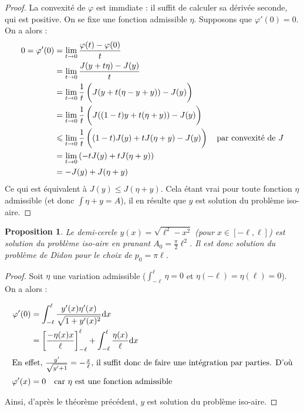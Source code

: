 \documentclass[10pt,a4paper]{article}
\renewcommand{\d}{\mathrm{d}}
\renewcommand{\phi}{\varphi}
\theoremstyle{plain}
\newtheorem{prop}[thm]{Proposition}
\theoremstyle{definition}
\begin{document}
\begin{proof}
La convexité de $\phi$ est immdiate : il suffit de calculer sa dérivée seconde, qui est positive.
On se fixe une fonction admissible $\eta$. Supposons que $\phi'(0)=0$. On a alors :
\begin{align*}
0=\phi'(0)&=\lim_{t\to 0}\dfrac{\phi(t)-\phi(0)}{t}\\
			&= \lim_{t\to0}\frac{J(y+t\eta)-J(y)}{t}\\
			&= \lim_{t\to0}\frac{1}{t}\left(\vphantom{\frac{1}{2}}J(y+t(\eta-y+y))-J(y)\right)\\
			&= \lim_{t\to0}\frac{1}{t}\left(\vphantom{\frac{1}{2}}J((1-t)y+t(\eta+y))-J(y)\right)\\
			&\leqslant\lim_{t\to0}\frac{1}{t}\left(\vphantom{\frac{1}{2}}(1-t)J(y)+tJ(\eta+y)-J(y)\right)\quad\text{par convexité de $J$}\\
			&= \lim_{t\to0}\left(-tJ(y)+tJ(\eta+y)\right)\\
			&= -J(y)+J(\eta+y)
\end{align*}
Ce qui est équivalent à $J(y)\leqslant J(\eta+y)$. Cela étant vrai pour toute fonction $\eta$ admissible (et donc $\int\eta+y=A$), il en résulte que $y$ est solution du problème iso-aire. 
\end{proof}




\begin{prop}
Le demi-cercle $y(x)=\sqrt{\ell^2-x^2}$ (pour $x\in[-\ell,\ell]$) est solution du problème iso-aire en pranant $A_0=\frac{\pi}{2}\ell^2$. Il est donc solution du problème de Didon pour le choix de $p_0=\pi \ell$.
\end{prop}



\begin{proof}
Soit $\eta$ une variation admissible ($\int_{-\ell}^\ell\eta=0$ et $\eta(-\ell)=\eta(\ell)=0$). On a alors :

\begin{align*}
\varphi'(0) &= \int_{-\ell}^\ell \frac{y'(x)\eta'(x)}{\sqrt{1+y'(x)^2}}\d x\\
			&= \left[\frac{-\eta(x) x}{\ell}\right]_{-\ell}^\ell + \int_{-\ell}^\ell\frac{\eta(x)}{\ell}\d x\\
\intertext{En effet, $\frac{y'}{\sqrt{y'+1}}=-\frac{x}{\ell}$, il suffit donc de faire une intégration par parties. D'où}
\varphi'(x)&= 0\quad\text{car }\eta\text{ est une fonction admissible}
\end{align*}

Ainsi, d'après le théorème précédent, $y$ est solution du problème iso-aire.
\end{proof}
\end{document}
